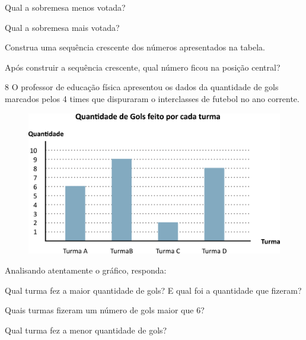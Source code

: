 \begin{escolha}
\item Qual a sobremesa menos votada?\\

\item Qual a sobremesa mais votada?\\

\item Construa uma sequência crescente dos números apresentados na tabela.\\

\item Após construir a sequência crescente, qual número ficou na posição central?\\
\end{escolha}

\num{8} O professor de educação física apresentou os dados da quantidade de gols
marcados pelos 4 times que dispuraram o interclasses de futebol no ano
corrente.

\begin{figure}[htpb!]
\centering
\includegraphics[width=.8\textwidth]{./media/image83.png}
\end{figure}

Analisando atentamente o gráfico, responda:

\begin{escolha}
\item Qual turma fez a maior quantidade de gols? E qual foi a quantidade que fizeram?\\

\enlargethispage{2\baselineskip}
\item Quais turmas fizeram um número de gols maior que 6?\\

\item Qual turma fez a menor quantidade de gols?\\
\end{escolha}

